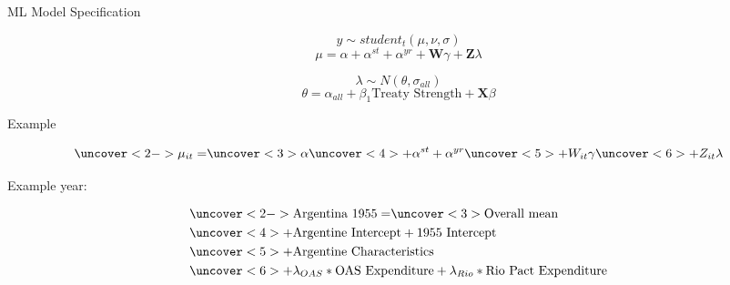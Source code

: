 \documentclass{beamer}
\begin{document}



\begin{frame}{ML Model Specification}

\begin{equation}
y \sim student_t(\mu, \nu, \sigma)
\end{equation}
\begin{equation}
\mu = \alpha + \alpha^{st} + \alpha^{yr} +\textbf{W} \gamma + \textbf{Z} \lambda
\end{equation}

\begin{equation}
\lambda \sim N(\theta, \sigma_{all})
\end{equation} 
\begin{equation}
\theta = \alpha_{all} + \beta_1 \mbox{Treaty Strength} + \textbf{X} \beta
\end{equation}


\end{frame}



\begin{frame}{Example}


\begin{equation*}
\uncover<2->{\mu_{it} =} \uncover<3>{\alpha} \uncover<4>{+ \alpha^{st} + \alpha^{yr}} \uncover<5>{+ W_{it} \gamma} \uncover<6>{+ Z_{it} \lambda}
\end{equation*}

Example year: 

\begin{equation*}
\begin{split}
& \uncover<2->{\mbox{Argentina 1955} = } \uncover<3>{\mbox{Overall mean}} \\
& \uncover<4>{+ \mbox{Argentine Intercept} + \mbox{1955 Intercept}} \\
& \uncover<5>{+ \mbox{Argentine Characteristics}} \\
& \uncover<6>{+ \lambda_{OAS} * \mbox{OAS Expenditure} + \lambda_{Rio} * \mbox{Rio Pact Expenditure}}
\end{split}
\end{equation*}



\end{frame}
\end{document}
